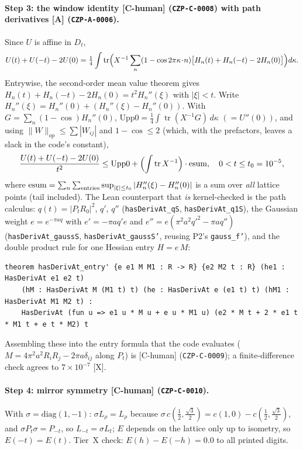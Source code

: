 \documentclass[10pt]{article}
\newcommand{\tier}[1]{\textsf{[#1]}}
\newcommand{\tA}{\tier{A}}
\newcommand{\tX}{\tier{X}}
\newcommand{\tCh}{\tier{C-human}}
\newcommand{\lean}[1]{\texttt{#1}}
\newcommand{\tr}{\operatorname{tr}}
\begin{document}
\paragraph{Step 3: the window identity \tCh{} (\texttt{CZP-C-0008}) with path derivatives \tA{} (\texttt{CZP-A-0006}).}
Since $U$ is affine in $D_t$,
\[U(t)+U(-t)-2U(0)=\tfrac14\int\tr\Bigl(X^{-1}\sum_n(1-\cos2\pi\kappa\!\cdot\! n)\bigl[H_n(t)+H_n(-t)-2H_n(0)\bigr]\Bigr)d\kappa .\]
Entrywise, the second-order mean value theorem gives $H_n(t)+H_n(-t)-2H_n(0)=t^2H_n''(\xi)$ with $|\xi|<t$. Write $H_n''(\xi)=H_n''(0)+(H_n''(\xi)-H_n''(0))$. With $G=\sum_n(1-\cos)H_n''(0)$, $\mathrm{Upp0}=\tfrac14\int\tr(X^{-1}G)\,d\kappa$ $(=U''(0))$, and using $\|W\|_{op}\le\sum|W_{ij}|$ and $1-\cos\le2$ (which, with the prefactors, leaves a slack in the code's constant),
\[\frac{U(t)+U(-t)-2U(0)}{t^2}\le\mathrm{Upp0}+\Bigl(\int\tr X^{-1}\Bigr)\cdot\mathrm{esum},\quad 0<t\le t_0=10^{-5},\]
where $\mathrm{esum}=\sum_{n}\sum_{\rm entries}\sup_{|\xi|\le t_0}|H_n''(\xi)-H_n''(0)|$ is a sum over \emph{all} lattice points (tail included).
The Lean counterpart that \emph{is} kernel-checked is the path calculus: $q(t)=|P_tR_0|^2$, $q'$, $q''$ (\lean{hasDerivAt\_qS}, \lean{hasDerivAt\_q1S}), the Gaussian weight $e=e^{-\pi aq}$ with $e'=-\pi aq'e$ and $e''=e(\pi^2a^2q'^2-\pi aq'')$ (\lean{hasDerivAt\_gaussS}, \lean{hasDerivAt\_gaussS'}, reusing P2's \lean{gauss\_f'}), and the double product rule for one Hessian entry $H=e\,M$:
\begin{lstlisting}
theorem hasDerivAt_entry' {e e1 M M1 : R -> R} {e2 M2 t : R} (he1 : HasDerivAt e1 e2 t)
    (hM : HasDerivAt M (M1 t) t) (he : HasDerivAt e (e1 t) t) (hM1 : HasDerivAt M1 M2 t) :
    HasDerivAt (fun u => e1 u * M u + e u * M1 u) (e2 * M t + 2 * e1 t * M1 t + e t * M2) t
\end{lstlisting}
Assembling these into the entry formula that the code evaluates ($M=4\pi^2a^2R_iR_j-2\pi a\delta_{ij}$ along $P_t$) is \tCh{} (\texttt{CZP-C-0009}); a finite-difference check agrees to $7\times10^{-7}$ \tX{}.

\paragraph{Step 4: mirror symmetry \tCh{} (\texttt{CZP-C-0010}).} With $\sigma=\mathrm{diag}(1,-1)$: $\sigma L_\rho=L_\rho$ because $\sigma\,c(\tfrac12,\tfrac{\sqrt3}2)=c(1,0)-c(\tfrac12,\tfrac{\sqrt3}2)$, and $\sigma P_t\sigma=P_{-t}$, so $L_{-t}=\sigma L_t$; $E$ depends on the lattice only up to isometry, so $E(-t)=E(t)$. Tier~X check: $E(h)-E(-h)=0.0$ to all printed digits.
\end{document}
